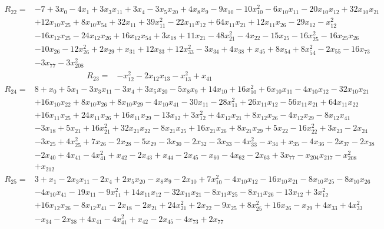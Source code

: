 \begin{align*}
 R_{22}={}&-7 +3x_{0} -4x_{1} +3x_{3}x_{11} +3x_{4} -3x_{5}x_{20} +4x_{8}x_{9} -9x_{10} -10x_{10}^{2} -6x_{10}x_{11} -20x_{10}x_{12} +32x_{10}x_{21}\\
 &+12x_{10}x_{25} +8x_{10}x_{54} +32x_{11} +39x_{11}^{2} -22x_{11}x_{12} +64x_{11}x_{21} +12x_{11}x_{26} -29x_{12} -x_{12}^{2}\\
 &-16x_{12}x_{25} -24x_{12}x_{26} +16x_{12}x_{54} +3x_{18} +11x_{21} -48x_{21}^{2} -4x_{22} -15x_{25} -16x_{25}^{2} -16x_{25}x_{26}\\
 &-10x_{26} -12x_{26}^{2} +2x_{29} +x_{31} +12x_{33} +12x_{33}^{2} -3x_{34} +4x_{38} +x_{45} +8x_{54} +8x_{54}^{2} -2x_{55} -16x_{73}\\
 &-3x_{77} -3x_{208}^{2}
\end{align*}
\begin{align*}
 R_{23}={}&-x_{12}^{2} -2x_{12}x_{13} -x_{13}^{2} +x_{41}
\end{align*}
\begin{align*}
 R_{24}={}&8 +x_{0} +5x_{1} -3x_{3}x_{11} -3x_{4} +3x_{5}x_{20} -5x_{8}x_{9} +14x_{10} +16x_{10}^{2} +6x_{10}x_{11} -4x_{10}x_{12} -32x_{10}x_{21}\\
 &+16x_{10}x_{22} +8x_{10}x_{26} +8x_{10}x_{29} -4x_{10}x_{41} -30x_{11} -28x_{11}^{2} +26x_{11}x_{12} -56x_{11}x_{21} +64x_{11}x_{22}\\
 &+16x_{11}x_{25} +24x_{11}x_{26} +16x_{11}x_{29} -13x_{12} +3x_{12}^{2} +4x_{12}x_{21} +8x_{12}x_{26} -4x_{12}x_{29} -8x_{12}x_{41}\\
 &-3x_{18} +5x_{21} +16x_{21}^{2} +32x_{21}x_{22} -8x_{21}x_{25} +16x_{21}x_{26} +8x_{21}x_{29} +5x_{22} -16x_{22}^{2} +3x_{23} -2x_{24}\\
 &-3x_{25} +4x_{25}^{2} +7x_{26} -2x_{28} -5x_{29} -3x_{30} -2x_{32} -3x_{33} -4x_{33}^{2} -x_{34} +x_{35} -4x_{36} -2x_{37} -2x_{38}\\
 &-2x_{40} +4x_{41} -4x_{41}^{2} +x_{42} -2x_{43} +x_{44} -2x_{45} -x_{60} -4x_{62} -2x_{63} +3x_{77} -x_{204}x_{217} -x_{208}^{2}\\
 &+x_{212}
\end{align*}
\begin{align*}
 R_{25}={}&3 +x_{1} -2x_{3}x_{11} -2x_{4} +2x_{5}x_{20} -x_{8}x_{9} -2x_{10} +7x_{10}^{2} -4x_{10}x_{12} -16x_{10}x_{21} -8x_{10}x_{25} -8x_{10}x_{26}\\
 &-4x_{10}x_{41} -19x_{11} -9x_{11}^{2} +14x_{11}x_{12} -32x_{11}x_{21} -8x_{11}x_{25} -8x_{11}x_{26} -13x_{12} +3x_{12}^{2}\\
 &+16x_{12}x_{26} -8x_{12}x_{41} -2x_{18} -2x_{21} +24x_{21}^{2} +2x_{22} -9x_{25} +8x_{25}^{2} +16x_{26} -x_{29} +4x_{33} +4x_{33}^{2}\\
 &-x_{34} -2x_{38} +4x_{41} -4x_{41}^{2} +x_{42} -2x_{45} -4x_{73} +2x_{77}
\end{align*}
